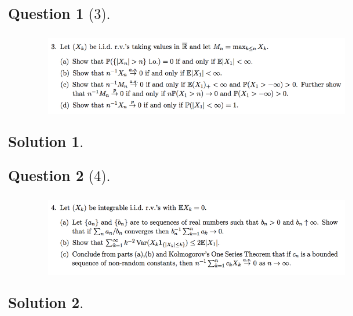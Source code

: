\documentclass{article} %
\theoremstyle{quest}
\newtheorem*{question}{Question}
\newtheorem*{solution}{Solution}
\begin{document}
\newpage

\begin{question}[3]
\hfill
\begin{figure}[h!]
  \centering
    \includegraphics[width=0.7\textwidth]{prob-e6-p3.png}
\end{figure}
\end{question}
\begin{solution} \hfill \\
\end{solution}

\newpage

\begin{question}[4]
\hfill
\begin{figure}[h!]
  \centering
    \includegraphics[width=0.7\textwidth]{prob-e6-p4.png}
\end{figure}
\end{question}
\begin{solution} \hfill \\
\end{solution}
\end{document}
